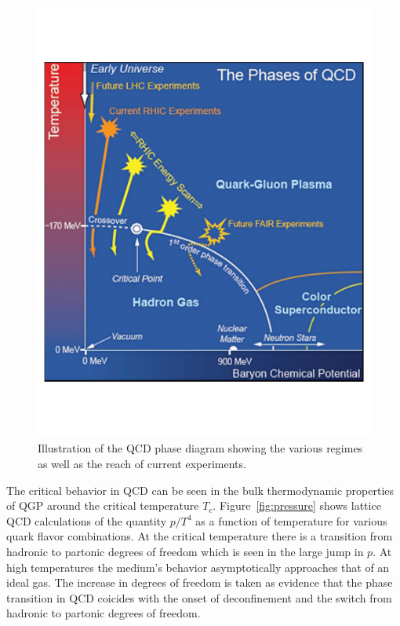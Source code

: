 \begin{figure}[htbp]
\begin{center}
\includegraphics[scale=0.5]{Plots/Intro/qcd_phase.pdf}
\end{center}
\caption[QCD Phase Diagram]{Illustration of the QCD phase diagram showing the various regimes as well as the reach of current experiments.}
\label{fig:qcd_phase}
\end{figure}

The critical behavior in QCD can be seen in the bulk thermodynamic properties of QGP around the critical temperature $T_c$. Figure~\ref{fig:pressure} shows lattice QCD calculations of the quantity $p/T^4$ as a function of temperature for various quark flavor combinations. At the critical temperature there is a transition from hadronic to partonic degrees of freedom which is seen in the large jump in $p$. At high temperatures the medium's behavior asymptotically approaches that of an ideal gas. The increase in degrees of freedom is taken as evidence that the phase transition in QCD coicides with the onset of deconfinement and the switch from hadronic to partonic degrees of freedom.

